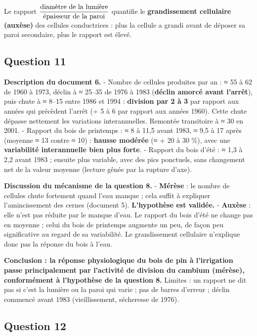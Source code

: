 \documentclass[11pt,a4paper]{article}
\newcommand{\equationajustee}[1]{%
  \sbox{\boiteequation}{$\displaystyle #1$}%
  \ifdim\wd\boiteequation>\linewidth
    \[\resizebox{\linewidth}{!}{\usebox{\boiteequation}}\]%
  \else
    \[#1\]%
  \fi}
\begin{document}
Le rapport \(\dfrac{\text{\text{diamètre} de la \text{lumière}}}{\text{\text{épaisseur} de la paroi}}\) quantifie le \textbf{grandissement cellulaire (auxèse)} des cellules conductrices : plus la cellule a grandi avant de déposer sa paroi secondaire, plus le rapport est élevé.

\equationajustee{\boxed{\text{\text{auxèse} (grandissement cellulaire)}}}

\hypertarget{question-11}{%
\subsection{Question 11}\label{question-11}}

\textbf{Description du document 6.}
- Nombre de cellules produites par an : ≈ 55 à 62 de 1960 à 1973, déclin à ≈ 25--35 de 1976 à 1983 (\textbf{déclin amorcé avant l'arrêt}), puis chute à ≈ 8--15 entre 1986 et 1994 : \textbf{division par 2 à 3} par rapport aux années qui précèdent l'arrêt (÷ 5 à 6 par rapport aux années 1960). Cette chute dépasse nettement les variations interannuelles. Remontée transitoire à ≈ 30 en 2001.
- Rapport du bois de printemps : ≈ 8 à 11,5 avant 1983, ≈ 9,5 à 17 après (moyenne ≈ 13 contre ≈ 10) : \textbf{hausse modérée} (≈ + 20 à 30 \%), avec une \textbf{variabilité interannuelle bien plus forte}.
- Rapport du bois d'été : ≈ 1,3 à 2,2 avant 1983 ; ensuite plus variable, avec des pics ponctuels, sans changement net de la valeur moyenne (lecture gênée par la rupture d'axe).

\textbf{Discussion du mécanisme de la question 8.}
- \textbf{Mérèse} : le nombre de cellules chute fortement quand l'eau manque ; cela suffit à expliquer l'amincissement des cernes (document 5). \textbf{L'hypothèse est validée.}
- \textbf{Auxèse} : elle n'est pas réduite par le manque d'eau. Le rapport du bois d'été ne change pas en moyenne ; celui du bois de printemps augmente un peu, de façon peu significative au regard de sa variabilité. Le grandissement cellulaire n'explique donc pas la réponse du bois à l'eau.

\textbf{Conclusion : la réponse physiologique du bois de pin à l'irrigation passe principalement par l'activité de division du cambium (mérèse), conformément à l'hypothèse de la question 8.} Limites : un rapport ne dit pas si c'est la lumière ou la paroi qui varie ; pas de barres d'erreur ; déclin commencé avant 1983 (vieillissement, sécheresse de 1976).

\hypertarget{question-12}{%
\subsection{Question 12}\label{question-12}}
\end{document}
